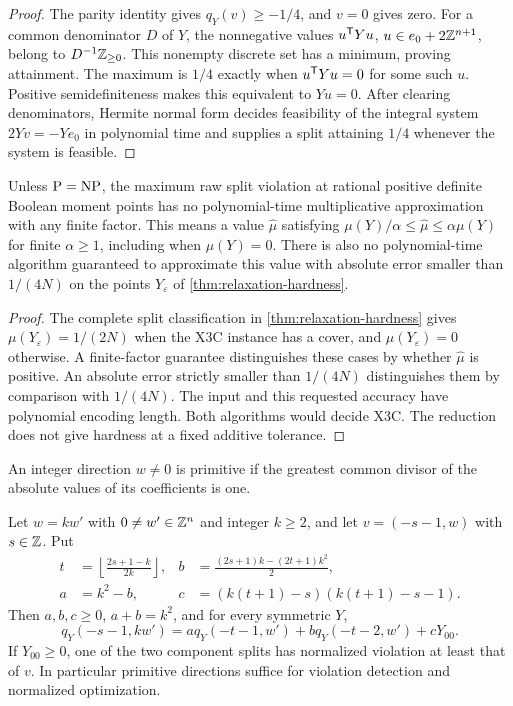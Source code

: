 \begin{proof}
The parity identity gives $q_Y(v)\ge-1/4$, and $v=0$ gives zero.
For a common denominator $D$ of $Y$, the nonnegative values
$u^{\mathsf T} Yu$, $u\in e_0+2\mathbb Z^{n+1}$, belong to $D^{-1}\mathbb Z_{\ge0}$.
This nonempty discrete set has a minimum, proving attainment.
The maximum is $1/4$ exactly when $u^{\mathsf T} Yu=0$ for some such $u$.
Positive semidefiniteness makes this equivalent to $Yu=0$.
After clearing denominators, Hermite normal form decides feasibility of
the integral system $2Yv=-Ye_0$ in polynomial time and supplies a split
attaining $1/4$ whenever the system is feasible.
\end{proof}

\begin{corollary}\label{cor:raw-approximation}
Unless $\mathrm P=\mathrm{NP}$, the maximum raw split violation at rational
positive definite Boolean moment points has no polynomial-time
multiplicative approximation with any finite factor.  This means a
value $\widehat\mu$ satisfying
$\mu(Y)/\alpha\leq\widehat\mu\leq\alpha\mu(Y)$ for finite
$\alpha\geq1$, including when $\mu(Y)=0$.
There is also no polynomial-time algorithm guaranteed to approximate
this value with absolute error smaller than $1/(4N)$ on the points
$Y_\varepsilon$ of \cref{thm:relaxation-hardness}.
\end{corollary}

\begin{proof}
The complete split classification in \cref{thm:relaxation-hardness}
gives $\mu(Y_\varepsilon)=1/(2N)$ when the X3C instance has a cover,
and $\mu(Y_\varepsilon)=0$ otherwise.  A finite-factor guarantee
distinguishes these cases by whether $\widehat\mu$ is positive.
An absolute error strictly smaller than $1/(4N)$ distinguishes them
by comparison with $1/(4N)$.  The input and this requested accuracy
have polynomial encoding length.  Both algorithms would decide X3C.
The reduction does not give hardness at a fixed additive tolerance.
\end{proof}

An integer direction $w\ne0$ is primitive if the greatest common
divisor of the absolute values of its coefficients is one.

\begin{lemma}\label{lem:primitive-split-domination}
Let $w=kw'$ with $0\ne w'\in\mathbb Z^n$ and integer $k\ge2$, and let
$v=(-s-1,w)$ with $s\in\mathbb Z$. Put
\begin{align*}
 t&=\left\lfloor\frac{2s+1-k}{2k}\right\rfloor,
 &b&=\frac{(2s+1)k-(2t+1)k^2}{2},\\
 a&=k^2-b,
 &c&=(k(t+1)-s)(k(t+1)-s-1).
\end{align*}
Then $a,b,c\ge0$, $a+b=k^2$, and for every symmetric $Y$,
\[
 q_Y(-s-1,kw')=
 a q_Y(-t-1,w')+b q_Y(-t-2,w')+cY_{00}.
\]
If $Y_{00}\ge0$, one of the two component splits has normalized violation
at least that of $v$. In particular primitive directions suffice for
violation detection and normalized optimization.
\end{lemma}

